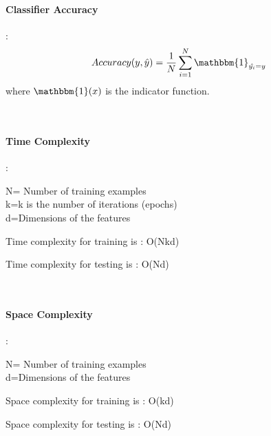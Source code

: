 \documentclass[11pt,french,english]{article}
\begin{document}
\paragraph{Classifier Accuracy }: 
\begin{align*}
    Accuracy (y, \hat{y})= \frac{1}{N} \sum_{i=1}^N \mathbbm{1}_{\hat{y_i} = y}
\end{align*}
where $\mathbbm{1} (x)$  is the indicator function.

\\
\paragraph{Time Complexity}:

N= Number of training examples\\
k=k is the number of iterations (epochs)\\ 
d=Dimensions of the features

Time complexity for training is : O(Nkd)

Time complexity for testing is : O(Nd)

\\
\paragraph{Space Complexity}:

N= Number of training examples\\
d=Dimensions of the features

Space complexity for training is : O(kd)

Space complexity for testing is : O(Nd)
\end{document}
